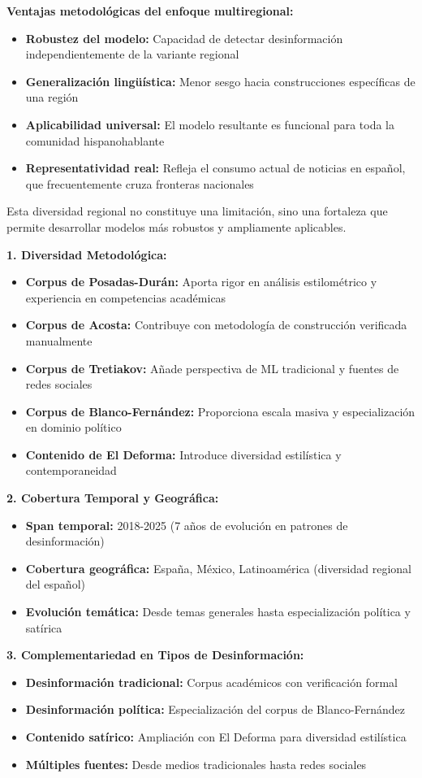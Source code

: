 \textbf{Ventajas metodológicas del enfoque multiregional:}
\begin{itemize}
    \item \textbf{Robustez del modelo:} Capacidad de detectar desinformación independientemente de la variante regional
    \item \textbf{Generalización lingüística:} Menor sesgo hacia construcciones específicas de una región
    \item \textbf{Aplicabilidad universal:} El modelo resultante es funcional para toda la comunidad hispanohablante
    \item \textbf{Representatividad real:} Refleja el consumo actual de noticias en español, que frecuentemente cruza fronteras nacionales
\end{itemize}

Esta diversidad regional no constituye una limitación, sino una fortaleza que permite desarrollar modelos más robustos y ampliamente aplicables.

\textbf{1. Diversidad Metodológica:}
\begin{itemize}
    \item \textbf{Corpus de Posadas-Durán:} Aporta rigor en análisis estilométrico y experiencia en competencias académicas
    \item \textbf{Corpus de Acosta:} Contribuye con metodología de construcción verificada manualmente
    \item \textbf{Corpus de Tretiakov:} Añade perspectiva de ML tradicional y fuentes de redes sociales
    \item \textbf{Corpus de Blanco-Fernández:} Proporciona escala masiva y especialización en dominio político
    \item \textbf{Contenido de El Deforma:} Introduce diversidad estilística y contemporaneidad
\end{itemize}

\textbf{2. Cobertura Temporal y Geográfica:}
\begin{itemize}
    \item \textbf{Span temporal:} 2018-2025 (7 años de evolución en patrones de desinformación)
    \item \textbf{Cobertura geográfica:} España, México, Latinoamérica (diversidad regional del español)
    \item \textbf{Evolución temática:} Desde temas generales hasta especialización política y satírica
\end{itemize}

\textbf{3. Complementariedad en Tipos de Desinformación:}
\begin{itemize}
    \item \textbf{Desinformación tradicional:} Corpus académicos con verificación formal
    \item \textbf{Desinformación política:} Especialización del corpus de Blanco-Fernández
    \item \textbf{Contenido satírico:} Ampliación con El Deforma para diversidad estilística
    \item \textbf{Múltiples fuentes:} Desde medios tradicionales hasta redes sociales
\end{itemize}

